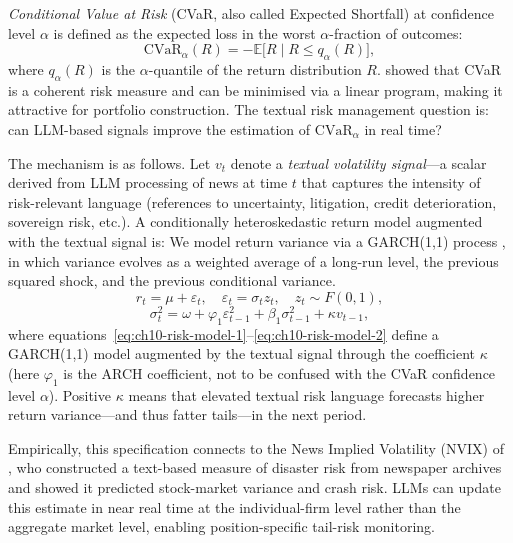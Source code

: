 \emph{Conditional Value at Risk} (CVaR, also called Expected Shortfall) at confidence
level $\alpha$ is defined as the expected loss in the worst $\alpha$-fraction of outcomes:
\begin{equation}
  \text{CVaR}_\alpha(R) = -\mathbb{E}\bigl[R \mid R \leq q_\alpha(R)\bigr],
  \label{eq:ch10-cvar}
\end{equation}
where $q_\alpha(R)$ is the $\alpha$-quantile of the return distribution $R$.
\citet{rockafellar2000optimization} showed that CVaR is a coherent risk measure and can be
minimised via a linear program, making it attractive for portfolio construction. The
textual risk management question is: can LLM-based signals improve the estimation of
$\text{CVaR}_\alpha$ in real time?

The mechanism is as follows. Let $v_t$ denote a \emph{textual volatility signal}---a
scalar derived from LLM processing of news at time $t$ that captures the intensity of
risk-relevant language (references to uncertainty, litigation, credit deterioration,
sovereign risk, etc.). A conditionally heteroskedastic return model augmented with the
textual signal is:
We model return variance via a GARCH(1,1) process \citep{bollerslev1986}, in which variance evolves as a weighted average of a long-run level, the previous squared shock, and the previous conditional variance.
\begin{equation}
  r_t = \mu + \varepsilon_t, \quad \varepsilon_t = \sigma_t z_t, \quad z_t \sim F(0, 1),
  \label{eq:ch10-risk-model-1}
\end{equation}
\begin{equation}
  \sigma_t^2 = \omega + \varphi_1 \varepsilon_{t-1}^2 + \beta_1 \sigma_{t-1}^2
               + \kappa v_{t-1},
  \label{eq:ch10-risk-model-2}
\end{equation}
where equations~\eqref{eq:ch10-risk-model-1}--\eqref{eq:ch10-risk-model-2} define a
GARCH(1,1) model augmented by the textual signal through the coefficient $\kappa$
(here $\varphi_1$ is the ARCH coefficient, not to be confused with the CVaR confidence
level $\alpha$).
Positive $\kappa$ means that elevated textual risk language forecasts higher return
variance---and thus fatter tails---in the next period.

Empirically, this specification connects to the News Implied Volatility (NVIX) of
\citet{manela2017news}, who constructed a text-based measure of disaster risk from
newspaper archives and showed it predicted stock-market variance and crash risk.
LLMs can update this estimate in near real time at the individual-firm level rather
than the aggregate market level, enabling position-specific tail-risk monitoring.

